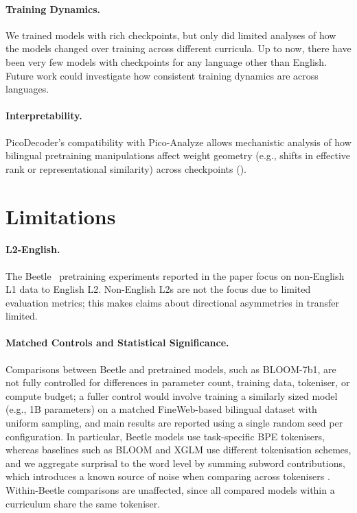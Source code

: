 \documentclass[11pt]{article}
\newcommand{\beetle}{Beetle} %
\begin{document}
\paragraph{Training Dynamics.} We trained models with rich checkpoints, but only did limited analyses of how the models changed over training across different curricula. Up to now, there have been very few models with checkpoints for any language other than English. Future work could investigate how consistent training dynamics are across languages.

\paragraph{Interpretability.}
PicoDecoder's compatibility with Pico-Analyze \citep{diehl-martinez-etal-2025-pico} allows mechanistic analysis of how bilingual pretraining manipulations affect weight geometry (e.g., shifts in effective rank or representational similarity) across checkpoints (\citealp{diehl-martinez-etal-2025-pico,inaba-etal-2025-bilingual}).  %

\section{Limitations}

\paragraph{L2-English.}\label{sec:limitations-forward-direction} The \beetle~ pretraining experiments reported in the paper focus on non-English L1 data to English L2. Non-English L2s are not the focus due to limited evaluation metrics; this makes claims about directional asymmetries in transfer limited. 

\paragraph{Matched Controls and Statistical Significance.} Comparisons between \beetle{} and pretrained models, such as BLOOM-7b1, are not fully controlled for differences in parameter count, training data, tokeniser, or compute budget; a fuller control would involve training a similarly sized model (e.g., 1B parameters) on a matched FineWeb-based bilingual dataset with uniform sampling, and main results are reported using a single random seed per configuration. In particular, \beetle{} models use task-specific BPE tokenisers, whereas baselines such as BLOOM and XGLM use different tokenisation schemes, and we aggregate surprisal to the word level by summing subword contributions, which introduces a known source of noise when comparing across tokenisers \citep{pimentel-meister-2024-compute}. Within-\beetle{} comparisons are unaffected, since all compared models within a curriculum share the same tokeniser. %
\end{document}
